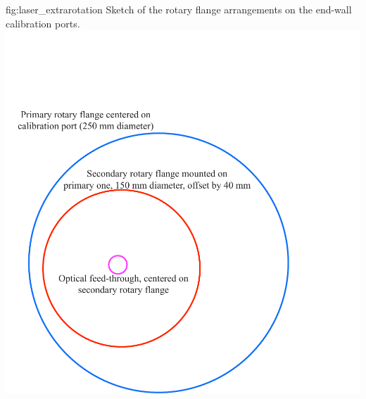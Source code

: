 \begin{dunefigure}{fig:laser_extrarotation}
{Sketch of the rotary flange arrangements on the end-wall calibration ports.}
\includegraphics[width=0.6\linewidth]{graphics/laser_extrarotation.pdf}
\end{dunefigure}





